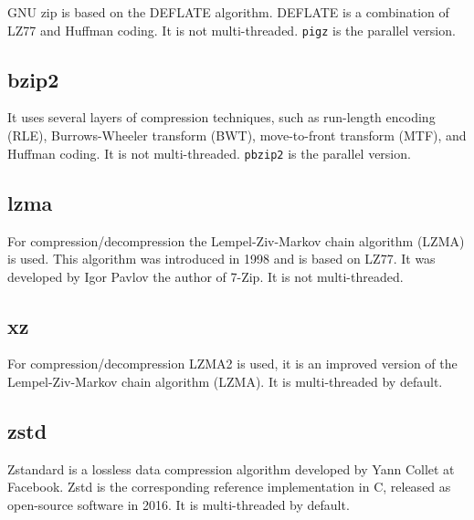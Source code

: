 \documentclass[12pt, a4paper]{report}
\begin{document}
GNU zip is based on the DEFLATE algorithm.
DEFLATE is a combination of LZ77 and Huffman coding.
It is not multi-threaded.
\texttt{pigz} is the parallel version.

\subsection{bzip2}

It uses several layers of compression techniques, such as run-length encoding (RLE), Burrows-Wheeler transform (BWT),
move-to-front transform (MTF), and Huffman coding.
It is not multi-threaded.
\texttt{pbzip2} is the parallel version.

\subsection{lzma}

For compression/decompression the Lempel-Ziv-Markov chain algorithm (LZMA) is used.
This algorithm was introduced in 1998 and is based on LZ77.
It was developed by Igor Pavlov the author of 7-Zip.
It is not multi-threaded.

\subsection{xz}

For compression/decompression LZMA2 is used, it is an improved version of the Lempel-Ziv-Markov chain algorithm (LZMA).
It is multi-threaded by default.

\subsection{zstd}

Zstandard is a lossless data compression algorithm developed by Yann Collet at Facebook.
Zstd is the corresponding reference implementation in C, released as open-source software in 2016.
It is multi-threaded by default.

\appendix

\printbibliography
\end{document}
